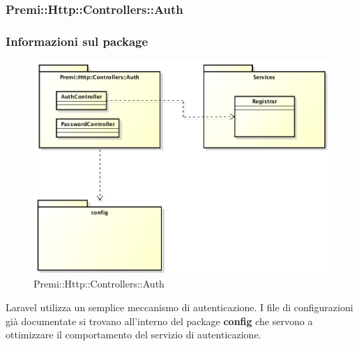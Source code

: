 	
	\subsubsection*{Premi::Http::Controllers::Auth}
		\subsubsection*{Informazioni sul package}
		\begin{figure}[h]
			\centering
			\includegraphics[width=0.9\linewidth]{img/premi_http_controllers_auth}
			\caption[Premi::Http::Controllers::Auth]{Premi::Http::Controllers::Auth}
			\label{fig:premi_http_controllers_auth}
		\end{figure}
	Laravel utilizza un semplice meccanismo di autenticazione. I file di configurazioni già documentate si trovano all'interno del package \textbf{config} che servono a ottimizzare il comportamento del servizio di autenticazione.		
